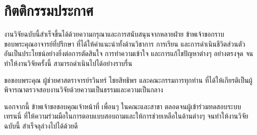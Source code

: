\chapter*{กิตติกรรมประกาศ}

งานวิจัยฉบับนี้สำเร็จขึ้นได้ด้วยความกรุณาและการสนับสนุนจากหลายฝ่าย ข้าพเจ้าขอกราบ
ขอบพระคุณ\advisor\space อาจารย์ที่ปรึกษา ที่ได้ให้คำแนะนำทั้งด้านวิชาการ
การเรียน และการดำเนินชีวิตส่วนตัว อันเป็นประโยชน์อย่างยิ่งต่อการตัดสินใจ
การทำความเข้าใจ และการแก้ไขปัญหาต่างๆ อย่างตรงจุด จนทำให้งานวิจัยครั้งนี้
สามารถดำเนินไปได้อย่างราบรื่น

ขอขอบพระคุณ ผู้ช่วยศาสตราจารย์รวินทร์ ไชยสิทธิพร และคณะกรรมการทุกท่าน
ที่ได้ให้เกียรติเป็นผู้พิจารณาตรวจสอบงานวิจัยด้วยความเป็นธรรมและความเป็นกลาง

นอกจากนี้ ข้าพเจ้าขอขอบคุณเจ้าหน้าที่ เพื่อนๆ ในคณะและสาขา ตลอดจนผู้เข้าร่วมทดสอบระบบเทรนนี่
ที่ให้ความร่วมมือในการตอบแบบสอบถามและให้การช่วยเหลือในด้านต่างๆ จนทำให้งานวิจัยฉบับนี้
สำเร็จลุล่วงไปได้ด้วยดี

\begin{flushright}
\authorname
\end{flushright}
\clearpage
